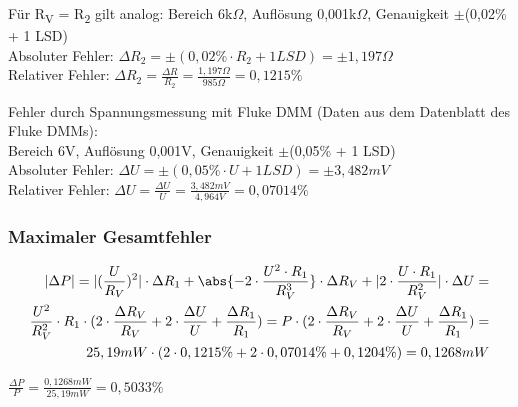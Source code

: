 Für R\textsubscript{V} = R\textsubscript{2} gilt analog:
Bereich 6k$\Omega$, Auflösung 0,001k$\Omega$, Genauigkeit $\pm$(0,02\% + 1 LSD)\\
Absoluter Fehler: $\Delta R_2 = \pm (0,02\% \cdot R_2 + 1 LSD) = \pm 1,197\Omega$\\
Relativer Fehler: $\Delta R_2 = \frac{\Delta R}{R_2} = \frac{1,197 \Omega}{985 \Omega} = 0,1215\%$\par

Fehler durch Spannungsmessung mit Fluke DMM (Daten aus dem Datenblatt des Fluke DMMs):\\
Bereich 6V, Auflösung 0,001V, Genauigkeit $\pm$(0,05\% + 1 LSD)\\
Absoluter Fehler: $\Delta U = \pm (0,05\% \cdot U + 1 LSD) = \pm 3,482 mV$\\
Relativer Fehler: $\Delta U = \frac{\Delta U}{U} = \frac{3,482 mV}{4,964 V} = 0,07014\%$\\

\subsubsection{Maximaler Gesamtfehler}
\[
    \begin{aligned}
    |\Delta P| = |(\frac{U}{R_V})^2| \cdot \Delta R_1 + \abs{-2 \cdot \frac{U^2 \cdot R_1}{R_V^3}} \cdot \Delta R_V + |2 \cdot \frac{U \cdot R_1 }{R_V^2}| \cdot \Delta U = \\
    \frac{U^2}{R_V^2} \cdot R_1 \cdot (2 \cdot \frac{\Delta R_V}{R_V} + 2 \cdot \frac{\Delta U}{U} + \frac{\Delta R_1}{R_1}) = 
    P \cdot (2 \cdot \frac{\Delta R_V}{R_V} + 2 \cdot \frac{\Delta U}{U} + \frac{\Delta R_1}{R_1}) = \\
    25,19 mW \cdot (2 \cdot 0,1215\% + 2 \cdot 0,07014\% + 0,1204\%)  = 0,1268 mW
    \end{aligned}
\]

$\frac{\Delta P}{P} = \frac{0,1268 mW}{25,19 mW} = 0,5033\%$